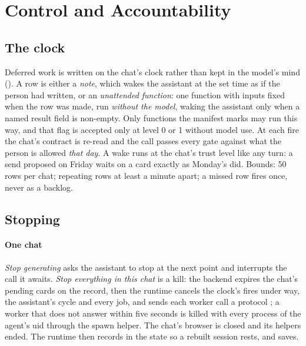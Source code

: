 \section{Control and Accountability}
\label{sec:control}

\subsection{The clock}

Deferred work is written on the chat's clock rather than kept in the
model's mind (). A row is either a
\emph{note}, which wakes the assistant at the set time as if the person
had written, or an \emph{unattended function}: one function with inputs
fixed when the row was made, run \emph{without the model}, waking the
assistant only when a named result field is non-empty. Only functions
the manifest marks  may run this way, and that flag
is accepted only at level 0 or 1 without model use. At each fire the
chat's contract is re-read and the call passes every gate against what
the person is allowed \emph{that day}. A wake runs at the chat's trust
level like any turn: a send proposed on Friday waits on a card exactly
as Monday's did. Bounds: 50 rows per chat; repeating rows at least a
minute apart; a missed row fires once, never as a backlog.

\subsection{Stopping}

\paragraph{One chat}
\emph{Stop generating} asks the assistant to stop at the next point and
interrupts the call it awaits. \emph{Stop everything in this chat} is a
kill: the backend expires the chat's pending cards on the record, then
the runtime cancels the clock's fires under way, the assistant's cycle
and every job, and sends each worker call a protocol ; a
worker that does not answer within five seconds is killed with every
process of the agent's uid through the spawn helper. The chat's browser
is closed and its helpers ended. The runtime then records
 in the state so a rebuilt session rests, and saves.

